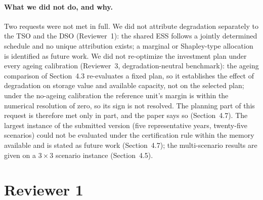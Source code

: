 \documentclass[11pt]{article}
\begin{document}
\paragraph{What we did not do, and why.}
Two requests were not met in full. We did not attribute degradation separately to the TSO and the DSO (Reviewer~1): the shared ESS follows a jointly determined schedule and no unique attribution exists; a marginal or Shapley-type allocation is identified as future work. We did not re-optimize the investment plan under every ageing calibration (Reviewer~3, degradation-neutral benchmark): the ageing comparison of Section~4.3 re-evaluates a fixed plan, so it establishes the effect of degradation on storage value and available capacity, not on the selected plan; under the no-ageing calibration the reference unit's margin is within the numerical resolution of zero, so its sign is not resolved. The planning part of this request is therefore met only in part, and the paper says so (Section~4.7). The largest instance of the submitted version (five representative years, twenty-five scenarios) could not be evaluated under the certification rule within the memory available and is stated as future work (Section~4.7); the multi-scenario results are given on a $3\times3$ scenario instance (Section~4.5).

\section*{Reviewer 1}
\end{document}
